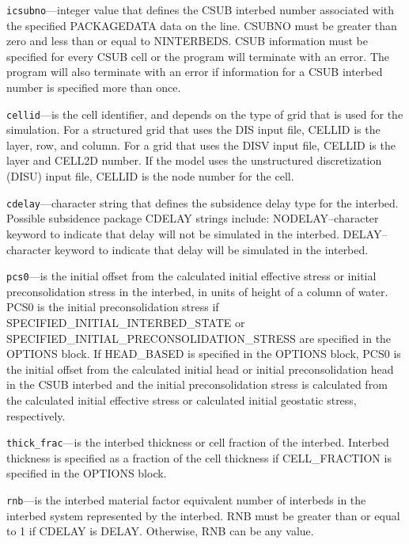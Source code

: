 \begin{description}
\item \texttt{icsubno}---integer value that defines the CSUB interbed number associated with the specified PACKAGEDATA data on the line. CSUBNO must be greater than zero and less than or equal to NINTERBEDS.  CSUB information must be specified for every CSUB cell or the program will terminate with an error.  The program will also terminate with an error if information for a CSUB interbed number is specified more than once.

\item \texttt{cellid}---is the cell identifier, and depends on the type of grid that is used for the simulation.  For a structured grid that uses the DIS input file, CELLID is the layer, row, and column.   For a grid that uses the DISV input file, CELLID is the layer and CELL2D number.  If the model uses the unstructured discretization (DISU) input file, CELLID is the node number for the cell.

\item \texttt{cdelay}---character string that defines the subsidence delay type for the interbed. Possible subsidence package CDELAY strings include: NODELAY--character keyword to indicate that delay will not be simulated in the interbed.  DELAY--character keyword to indicate that delay will be simulated in the interbed.

\item \texttt{pcs0}---is the initial offset from the calculated initial effective stress or initial preconsolidation stress in the interbed, in units of height of a column of water. PCS0 is the initial preconsolidation stress if SPECIFIED\_INITIAL\_INTERBED\_STATE or SPECIFIED\_INITIAL\_PRECONSOLIDATION\_STRESS are specified in the OPTIONS block. If HEAD\_BASED is specified in the OPTIONS block, PCS0 is the initial offset from the calculated initial head or initial preconsolidation head in the CSUB interbed and the initial preconsolidation stress is calculated from the calculated initial effective stress or calculated initial geostatic stress, respectively.

\item \texttt{thick\_frac}---is the interbed thickness or cell fraction of the interbed. Interbed thickness is specified as a fraction of the cell thickness if CELL\_FRACTION is specified in the OPTIONS block.

\item \texttt{rnb}---is the interbed material factor equivalent number of interbeds in the interbed system represented by the interbed. RNB must be greater than or equal to 1 if CDELAY is DELAY. Otherwise, RNB can be any value.


\end{description}
